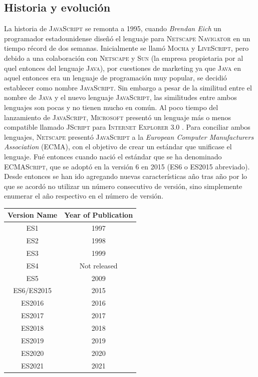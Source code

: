 \documentclass[a4paper, 11pt]{book}
\begin{document}
\subsection{Historia y evolución}
La historia de \textsc{JavaScript} se remonta a 1995, cuando \emph{Brendan Eich} un programador estadounidense diseñó el lenguaje para \textsc{Netscape Navigator} en un tiempo récord de dos semanas. Inicialmente se llamó \textsc{Mocha} y \textsc{LiveScript}, pero debido  a una colaboración con \textsc{Netscape} y \textsc{Sun} (la empresa propietaria por al quel entonces del lenguaje \textsc{Java}), por cuestiones de marketing ya que \textsc{Java} en aquel entonces era un lenguaje de programación muy popular, se decidió establecer como nombre \textsc{JavaScript}.
Sin embargo a pesar de la similitud entre el nombre de \textsc{Java} y el nuevo lenguaje \textsc{JavaScript}, las similitudes entre ambos lenguajes son pocas y no tienen mucho en común.
Al poco tiempo del lanzamiento de \textsc{JavaScript}, \textsc{Microsoft} presentó un lenguaje más o menos compatible llamado \textsc{JScript} para \textsc{Internet Explorer 3.0} .
Para conciliar ambos lenguajes, \textsc{Netscape} presentó \textsc{JavaScript} a la \emph{European Computer Manufacturers Association} (\textsc{\gls{ECMA}}), con el objetivo de crear un estándar que unificase el lenguaje. Fué entonces cuando nació el estándar que se ha denominado \textsc{ECMAScript}, que se adoptó en la versión 6 en 2015 (\textsc{ES6} o \textsc{ES2015} abreviado). Desde entonces se han ido agregando nuevas características año tras año por lo que se acordó no utilizar un número consecutivo de versión, sino simplemente enumerar el año respectivo en el número de versión.
\begin{center}
	\begin{tabular}{|c|c|}
		\hline
		\textbf{Version Name} & \textbf{Year of Publication} \\
		\hline
		ES1 & 1997 \\
		ES2 & 1998 \\
		ES3 & 1999 \\
		ES4 & Not released \\
		ES5 & 2009 \\
		ES6/ES2015 & 2015 \\
		ES2016 & 2016 \\
		ES2017 & 2017 \\
		ES2018 & 2018 \\
		ES2019 & 2019 \\
		ES2020 & 2020 \\
		ES2021 & 2021 \\
		\hline
	\end{tabular}
\end{center}
\end{document}
